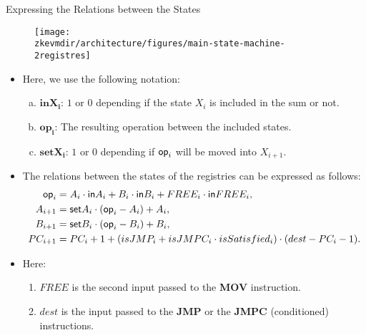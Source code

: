 \begin{frame}[allowframebreaks]{Expressing the Relations between the States}
\vspace{-0.3cm}
\begin{figure}
	\texttt{[image: \\zkevmdir/architecture/figures/main-state-machine-2registres]}
\end{figure}

\begin{itemize}
\item Here, we use the following notation:
\begin{enumerate}[a)]
\item $\mathbf{inX_i}$: $1$ or $0$ depending if the state $X_i$ is included in the sum or not.

\item $\mathbf{op_i}$: The resulting operation between the included states.

\item $\mathbf{setX_i}$: $1$ or $0$ depending if $\mathsf{op}_i$ will be moved into $X_{i+1}$.
\end{enumerate}
 
\item The relations between the states of the registries can be expressed as follows:
\begin{align*}
\op_i &= A_i \cdot \inp A_i + B_i \cdot \inp B_i + FREE_i \cdot \inp FREE_i, \\
A_{i+1} &= \set A_i \cdot (\op_i - A_i) %
+ A_i, \\
B_{i+1} &= \set B_i \cdot (\op_i - B_i) %
+ B_i, \\
PC_{i+1} &= PC_i + 1 + (isJMP_i + isJMPC_i \cdot isSatisfied_i) \cdot (dest - PC_i - 1).
\end{align*}

\item Here:
\begin{enumerate}
\item $FREE$ is the second input passed to the \textbf{MOV} instruction.

\item $dest$ is the input passed to the \textbf{JMP} or the \textbf{JMPC} (conditioned) instructions.
\end{enumerate}
\end{itemize}
\end{frame}










